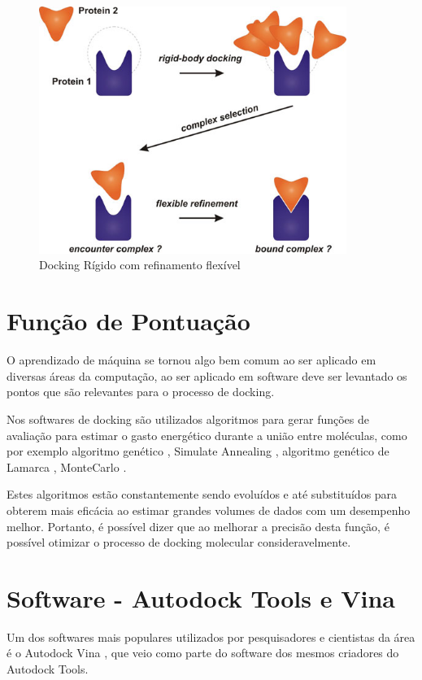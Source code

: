 \documentclass[tcc, capa]{texucpel}
\begin{document}
      \begin{figure}[!htb]
	\centering\includegraphics[width=10cm]{imagens/rigid_flexible.jpg}
	\caption{Docking Rígido com refinamento flexível}
	\end{figure}

\section{Função de Pontuação}
O aprendizado de máquina se tornou algo bem comum ao ser aplicado em diversas áreas da computação, ao ser aplicado em software deve ser levantado os pontos que são relevantes para o processo de docking.

Nos softwares de docking são utilizados algoritmos para gerar funções de avaliação para estimar o gasto energético durante a união entre moléculas, como por exemplo algoritmo genético \cite{holland1975adaptation}, Simulate Annealing \cite{kirkpatrick1984optimization} ,  algoritmo genético de Lamarca \cite{morris1998automated},  MonteCarlo \cite{caflisch1992monte}.

Estes algoritmos estão constantemente sendo evoluídos e até substituídos para obterem mais eficácia ao estimar grandes volumes de dados com um desempenho melhor.
Portanto, é possível dizer que ao melhorar a precisão desta função, é possível otimizar o processo de docking molecular consideravelmente.

\section{Software - Autodock Tools e Vina}

Um dos softwares mais populares utilizados por pesquisadores e cientistas da área é o Autodock Vina \cite{trott2010autodock}, que veio como parte do software dos mesmos criadores do Autodock Tools.
\end{document}
